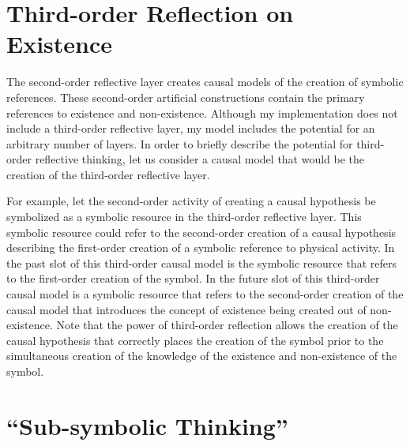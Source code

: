 \section{Third-order Reflection on Existence}

The second-order reflective layer creates causal models of the
creation of symbolic references.  These second-order artificial
constructions contain the primary references to existence and
non-existence.  Although my implementation does not include a
third-order reflective layer, my model includes the potential for an
arbitrary number of layers.  In order to briefly describe the
potential for third-order reflective thinking, let us consider a
causal model that would be the creation of the third-order reflective
layer.

For example, let the second-order activity of creating a causal
hypothesis be symbolized as a symbolic resource in the third-order
reflective layer.  This symbolic resource could refer to the
second-order creation of a causal hypothesis describing the
first-order creation of a symbolic reference to physical activity.  In
the past slot of this third-order causal model is the symbolic
resource that refers to the first-order creation of the symbol.  In
the future slot of this third-order causal model is a symbolic
resource that refers to the second-order creation of the causal model
that introduces the concept of existence being created out of
non-existence.  Note that the power of third-order reflection allows
the creation of the causal hypothesis that correctly places the
creation of the symbol prior to the simultaneous creation of the
knowledge of the existence and non-existence of the symbol.

\section{``Sub-symbolic Thinking''}

